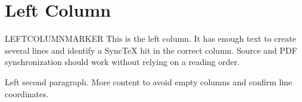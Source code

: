 \section*{Left Column}
LEFTCOLUMNMARKER This is the left column. It has enough text to create several lines and identify a SyncTeX hit in the correct column. Source and PDF synchronization should work without relying on a reading order.

Left second paragraph. More content to avoid empty columns and confirm line coordinates.